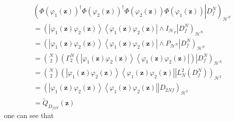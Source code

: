 \documentclass[aps,preprint]{revtex4}%
\begin{document}
\begin{align}
&  \left(  \left.  \Phi\left(  \varphi_{1}\left(  \mathbf{z}\right)  \right)
^{\dagger}\Phi\left(  \varphi_{2}\left(  \mathbf{z}\right)  \right)
^{\dagger}\Phi\left(  \varphi_{2}\left(  \mathbf{z}\right)  \right)
\Phi\left(  \varphi_{1}\left(  \mathbf{z}\right)  \right)  \right\vert
D_{f}^{N}\right)  _{\mathcal{H}^{N}}\nonumber\\
&  =\left(  \left.  \left\vert \varphi_{1}\left(  \mathbf{z}\right)
\varphi_{2}\left(  \mathbf{z}\right)  \right\rangle \left\langle \varphi
_{1}\left(  \mathbf{z}\right)  \varphi_{2}\left(  \mathbf{z}\right)
\right\vert \wedge I_{\mathcal{H}_{F}}\right\vert D_{f}^{N}\right)
_{\mathcal{H}^{N}}\nonumber\\
&  =\left(  \left.  \left\vert \varphi_{1}\left(  \mathbf{z}\right)
\varphi_{2}\left(  \mathbf{z}\right)  \right\rangle \left\langle \varphi
_{1}\left(  \mathbf{z}\right)  \varphi_{2}\left(  \mathbf{z}\right)
\right\vert \wedge P_{\mathcal{H}^{N}}\right\vert D_{f}^{N}\right)
_{\mathcal{H}^{N}}\nonumber\\
&  =\binom{N}{2}\left(  \left.  \Gamma_{2}^{N}\left(  \left\vert \varphi
_{1}\left(  \mathbf{z}\right)  \varphi_{2}\left(  \mathbf{z}\right)
\right\rangle \left\langle \varphi_{1}\left(  \mathbf{z}\right)  \varphi
_{2}\left(  \mathbf{z}\right)  \right\vert \right)  \right\vert D_{f}%
^{N}\right)  _{\mathcal{H}^{N}}\nonumber\\
&  =\binom{N}{2}\left(  \left.  \left\vert \varphi_{1}\left(  \mathbf{z}%
\right)  \varphi_{2}\left(  \mathbf{z}\right)  \right\rangle \left\langle
\varphi_{1}\left(  \mathbf{z}\right)  \varphi_{2}\left(  \mathbf{z}\right)
\right\vert \right\vert L_{N}^{2}\left(  D_{f}^{N}\right)  \right)
_{\mathcal{H}^{2}}\nonumber\\
&  =\left(  \left.  \left\vert \varphi_{1}\left(  \mathbf{z}\right)
\varphi_{2}\left(  \mathbf{z}\right)  \right\rangle \left\langle \varphi
_{1}\left(  \mathbf{z}\right)  \varphi_{2}\left(  \mathbf{z}\right)
\right\vert \right\vert D_{2Nf}\right)  _{\mathcal{H}^{2}}\nonumber\\
&  =\tilde{Q}_{D_{f2N}}\left(  \mathbf{z}\right)
\end{align}
one can see that
\end{document}
